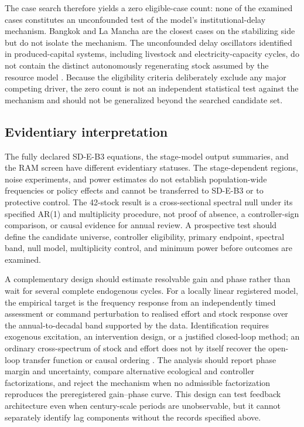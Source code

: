 \documentclass[11pt]{article}
\begin{document}
The case search therefore yields a zero eligible-case count: none of the examined cases constitutes an unconfounded test of the model's institutional-delay mechanism. Bangkok and La Mancha are the closest cases on the stabilizing side but do not isolate the mechanism. The unconfounded delay oscillators identified in produced-capital systems, including livestock and electricity-capacity cycles, do not contain the distinct autonomously regenerating stock assumed by the resource model \cite{rosen1994}. Because the eligibility criteria deliberately exclude any major competing driver, the zero count is not an independent statistical test against the mechanism and should not be generalized beyond the searched candidate set.

\subsection{Evidentiary interpretation}

The fully declared SD-E-B3 equations, the stage-model output summaries, and the RAM screen have different evidentiary statuses. The stage-dependent regions, noise experiments, and power estimates do not establish population-wide frequencies or policy effects and cannot be transferred to SD-E-B3 or to protective control. The 42-stock result is a cross-sectional spectral null under its specified AR(1) and multiplicity procedure, not proof of absence, a controller-sign comparison, or causal evidence for annual review. A prospective test should define the candidate universe, controller eligibility, primary endpoint, spectral band, null model, multiplicity control, and minimum power before outcomes are examined.

A complementary design should estimate resolvable gain and phase rather than wait for several complete endogenous cycles. For a locally linear registered model, the empirical target is the frequency response from an independently timed assessment or command perturbation to realised effort and stock response over the annual-to-decadal band supported by the data. Identification requires exogenous excitation, an intervention design, or a justified closed-loop method; an ordinary cross-spectrum of stock and effort does not by itself recover the open-loop transfer function or causal ordering \cite{forssell1999}. The analysis should report phase margin and uncertainty, compare alternative ecological and controller factorizations, and reject the mechanism when no admissible factorization reproduces the preregistered gain--phase curve. This design can test feedback architecture even when century-scale periods are unobservable, but it cannot separately identify lag components without the records specified above.
\end{document}
